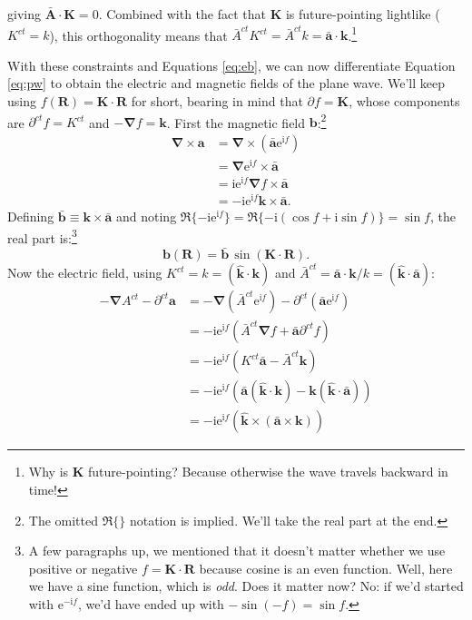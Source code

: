 \documentclass[12pt]{article}
\renewcommand{\vv}[1]{\mathbf{#1}}
\newcommand{\del}{\boldsymbol{\nabla}}
\begin{document}
giving $\bar{\vv A} \cdot \vv K = 0$. Combined with the fact that $\vv K$ is future-pointing lightlike ($K^{ct} = k$), this orthogonality means that $\bar{A}^{ct} K^{ct} = \bar{A}^{ct} k = \bar{\vv a} \cdot \vv k$.\footnote{Why is $\vv K$ future-pointing? Because otherwise the wave travels backward in time!}

With these constraints and Equations \ref{eq:eb}, we can now differentiate Equation \ref{eq:pw} to obtain the electric and magnetic fields of the plane wave. We'll keep using $f(\vv R) = \vv K \cdot \vv R$ for short, bearing in mind that $\partialup f = \vv K$, whose components are $\partial^{ct} f = K^{ct}$ and $- \del f = \vv k$. First the magnetic field $\vv b$:\footnote{The omitted $\Re \lbrace \rbrace$ notation is implied. We'll take the real part at the end.}
\begin{equation*}
\begin{aligned}
\del \times \vv a &= \del \times \left( \bar{\vv a} \mathrm{e}^{\mathrm{i} f} \right) \\
&= \del \mathrm{e}^{\mathrm{i} f} \times \bar{\vv a} \\
&= \mathrm{i} \mathrm{e}^{\mathrm{i} f} \del f \times \bar{\vv a} \\
&= - \mathrm{i} \mathrm{e}^{\mathrm{i} f} \vv k \times \bar{\vv a}.
\end{aligned}
\end{equation*}
Defining $\bar{\vv b} \equiv \vv k \times \bar{\vv a}$ and noting $\Re \lbrace - \mathrm{i} \mathrm{e}^{\mathrm{i} f} \rbrace = \Re \lbrace -\mathrm{i} ( \cos f + \mathrm{i} \sin f ) \rbrace = \sin f$, the real part is:\footnote{A few paragraphs up, we mentioned that it doesn't matter whether we use positive or negative $f = \vv K \cdot \vv R$ because cosine is an even function. Well, here we have a sine function, which is \emph{odd}. Does it matter now? No: if we'd started with $\mathrm{e}^{-\mathrm{i} f}$, we'd have ended up with $- \sin (-f) = \sin f$.}
\begin{equation}\label{eq:bpw}
\vv b (\vv R) = \bar{\vv b} \, \sin \left( \vv K \cdot \vv R \right) .
\end{equation}
Now the electric field, using $K^{ct} = k = (\vv{\hat{k}} \cdot \vv k)$ and $\bar{A}^{ct} = \bar{\vv a} \cdot \vv k / k = (\vv{\hat{k}} \cdot \bar{\vv a} )$:
\begin{equation*}
\begin{aligned}
- \del A^{ct} - \partial^{ct} \vv a &= - \del \left( \bar{A}^{ct} \mathrm{e}^{\mathrm{i} f} \right) - \partial^{ct} \left( \bar{\vv a} \mathrm{e}^{\mathrm{i} f} \right) \\
&= - \mathrm{i} \mathrm{e}^{\mathrm{i} f} \left( \bar{A}^{ct} \del f + \bar{\vv a} \partial^{ct} f \right) \\
&= - \mathrm{i} \mathrm{e}^{\mathrm{i} f} \left( K^{ct} \bar{\vv a} - \bar{A}^{ct} \vv k \right) \\
&= - \mathrm{i} \mathrm{e}^{\mathrm{i} f} \left( \bar{\vv a} (\vv{\hat{k}} \cdot \vv k )  - \vv k (\vv{\hat{k}} \cdot \bar{\vv a} ) \right) \\
&= - \mathrm{i} \mathrm{e}^{\mathrm{i} f} \left( \vv{\hat{k}} \times (\bar{\vv a} \times \vv k) \right)
\end{aligned}
\end{equation*}
\end{document}
